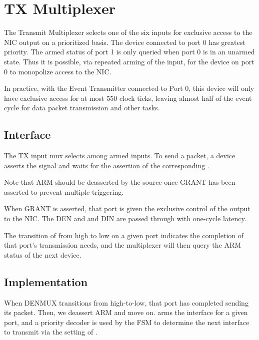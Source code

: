 
\section{TX Multiplexer}
The Transmit Multiplexer selects one of the six inputs for exclusive
access to the NIC output on a prioritized basis. The device connected
to port 0 has greatest priority. The armed status of port 1 is only
queried when port 0 is in an unarmed state. Thus it is possible, via
repeated arming of the input, for the device on port 0 to monopolize
access to the NIC.

In practice, with the Event Transmitter connected to Port 0, this
device will only have exclusive access for at most 550 clock ticks,
leaving almost half of the event cycle for data packet transmission
and other tasks.


\subsection{Interface}
The TX input mux selects among armed inputs. To send a packet, a
device asserts the  signal and waits for the assertion of
the corresponding .

Note that ARM should be deasserted by the source once GRANT has been
asserted to prevent multiple-triggering.

When GRANT is asserted, that port is given the exclusive control of
the output to the NIC. The DEN and and DIN are passed through with
one-cycle latency.

The transition of  from high to low on a given port
indicates the completion of that port's transmission needs, and the
multiplexer will then query the ARM status of the next device.


\subsection{Implementation}

When DENMUX transitions from high-to-low, that port has completed
sending its packet. Then, we deassert ARM and move on. 
arms the interface for a given port, and a priority decoder is used by
the FSM to determine the next interface to transmit via the setting of
.

